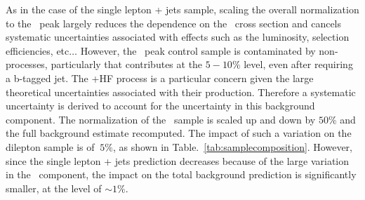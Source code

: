 As in the case of the single lepton + jets sample, scaling the overall 
normalization to the \mt\ peak largely reduces the dependence on the
\ttbar\ cross section and cancels systematic uncertainties associated
with effects such as the luminosity, selection efficiencies,
etc$\dots$ However, the \mt\ peak control sample is contaminated 
by non-\ttbar processes, particularly \wjets that contributes at
the $5-10\%$ level, even after requiring a b-tagged jet. The \wjets+HF
process is a particular concern given the large theoretical
uncertainties associated with their production. 
Therefore a systematic uncertainty is derived to account for
the uncertainty in this background component. The normalization of 
the \wjets\ sample is scaled up and down by $50\%$ and the full 
background estimate recomputed. The impact of such a variation on 
the dilepton sample is of $~5\%$, as shown in 
Table.~\ref{tab:samplecomposition}. However, since the
single lepton + jets prediction decreases because of the large
variation in the \wjets\ component, the impact on the total background
prediction is significantly smaller, at the level of $\sim 1\%$.

